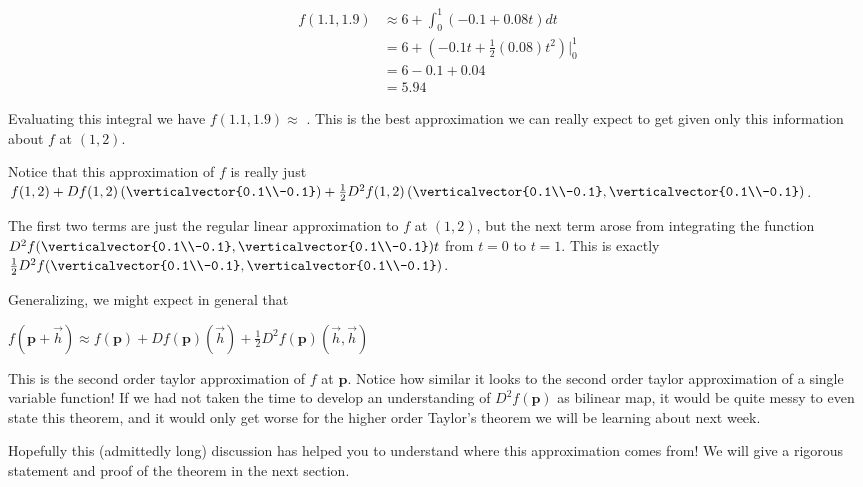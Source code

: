 \documentclass{ximera}
\begin{document}
\begin{question}
  \begin{solution}
    \begin{hint}
      \begin{align*}
        f(1.1,1.9) &\approx 6+ \displaystyle\int_0^1 (-0.1+0.08t) dt\\
        &=6+\left(-0.1t+\frac{1}{2}(0.08)t^2 \right)\big|_{0}^{1}\\
        &=6-0.1+0.04\\
        &=5.94
      \end{align*}
    \end{hint}
    Evaluating this integral we have $f(1.1,1.9) \approx $ .  This is the best approximation we can really expect to get given only this
    information about $f$ at $(1,2)$.
  \end{solution}
  
  Notice that this approximation of $f$ is really just 
  $f(1,2)+Df(1,2) \left(\verticalvector{0.1\\-0.1} \right)+ \frac{1}{2} D^2f(1,2)\left( \verticalvector{0.1\\-0.1}, \verticalvector{0.1\\-0.1}\right)$.
  
  The first two terms are just the regular linear approximation to $f$ at $(1,2)$, but the next term arose from integrating the function 
  $D^2f( \verticalvector{0.1\\-0.1},\verticalvector{0.1\\-0.1})t$ from $t=0$ to $t=1$.  This is  exactly
  $\frac{1}{2} D^2f(\verticalvector{0.1\\-0.1},\verticalvector{0.1\\-0.1})$.
  
  Generalizing, we might expect in general that 
  
  \begin{theorem}
    \(f(\mathbf{p} + \vec{h}) \approx f(\mathbf{p}) + Df(\mathbf{p})(\vec{h})+ \frac{1}{2} D^2f(\mathbf{p})\left( \vec{h},\vec{h}\right) \)
  \end{theorem}
  
  This is the second order taylor approximation of $f$ at $\mathbf{p}$.   Notice how similar it looks to the second order taylor approximation 
  of a single variable function!  If we had not taken the time to develop an understanding of $D^2f(\mathbf{p})$ as bilinear map, it would be quite messy 
  to even state this theorem, and it would only get worse for the higher order Taylor's theorem we will be learning about next week.
  
  Hopefully this (admittedly long) discussion has helped you to understand where this approximation comes from!  We will give a rigorous statement
  and proof of the theorem in the next section.
  
\end{question}
\end{document}
